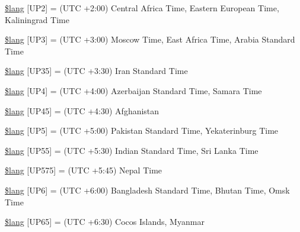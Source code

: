 \begin{DoxyCompactItemize}
\item 
\mbox{\hyperlink{date__lang_8php_a8bc77502b4cc249f60b8af409ed7eef4}{\$lang}} \mbox{[}\textquotesingle{}U\+P2\textquotesingle{}\mbox{]} = \textquotesingle{}(U\+TC +2\+:00) Central Africa Time, Eastern European Time, Kaliningrad Time\textquotesingle{}
\item 
\mbox{\hyperlink{date__lang_8php_a6b687b37212f87cb83bfec9ce99278ea}{\$lang}} \mbox{[}\textquotesingle{}U\+P3\textquotesingle{}\mbox{]} = \textquotesingle{}(U\+TC +3\+:00) Moscow Time, East Africa Time, Arabia Standard Time\textquotesingle{}
\item 
\mbox{\hyperlink{date__lang_8php_a6259e0a44ef6649bb13ebcb168b24a49}{\$lang}} \mbox{[}\textquotesingle{}U\+P35\textquotesingle{}\mbox{]} = \textquotesingle{}(U\+TC +3\+:30) Iran Standard Time\textquotesingle{}
\item 
\mbox{\hyperlink{date__lang_8php_adedd69e7f22fc28d1305c4d52e128eec}{\$lang}} \mbox{[}\textquotesingle{}U\+P4\textquotesingle{}\mbox{]} = \textquotesingle{}(U\+TC +4\+:00) Azerbaijan Standard Time, Samara Time\textquotesingle{}
\item 
\mbox{\hyperlink{date__lang_8php_a5147073b93fc84c0aa1500b75a602a32}{\$lang}} \mbox{[}\textquotesingle{}U\+P45\textquotesingle{}\mbox{]} = \textquotesingle{}(U\+TC +4\+:30) Afghanistan\textquotesingle{}
\item 
\mbox{\hyperlink{date__lang_8php_aaa23c67ef8823dbe22e7adb7f33c0ded}{\$lang}} \mbox{[}\textquotesingle{}U\+P5\textquotesingle{}\mbox{]} = \textquotesingle{}(U\+TC +5\+:00) Pakistan Standard Time, Yekaterinburg Time\textquotesingle{}
\item 
\mbox{\hyperlink{date__lang_8php_a6aac0dc512351660e4a6b24912761d94}{\$lang}} \mbox{[}\textquotesingle{}U\+P55\textquotesingle{}\mbox{]} = \textquotesingle{}(U\+TC +5\+:30) Indian Standard Time, Sri Lanka Time\textquotesingle{}
\item 
\mbox{\hyperlink{date__lang_8php_a5afdabd1247533e38fdadc74871a669d}{\$lang}} \mbox{[}\textquotesingle{}U\+P575\textquotesingle{}\mbox{]} = \textquotesingle{}(U\+TC +5\+:45) Nepal Time\textquotesingle{}
\item 
\mbox{\hyperlink{date__lang_8php_a432eb6246d6f3a1f21232e80139c633a}{\$lang}} \mbox{[}\textquotesingle{}U\+P6\textquotesingle{}\mbox{]} = \textquotesingle{}(U\+TC +6\+:00) Bangladesh Standard Time, Bhutan Time, Omsk Time\textquotesingle{}
\item 
\mbox{\hyperlink{date__lang_8php_a5f4fe559fb8bcc16ee8b5fa61d9f4699}{\$lang}} \mbox{[}\textquotesingle{}U\+P65\textquotesingle{}\mbox{]} = \textquotesingle{}(U\+TC +6\+:30) Cocos Islands, Myanmar\textquotesingle{}

\end{DoxyCompactItemize}
